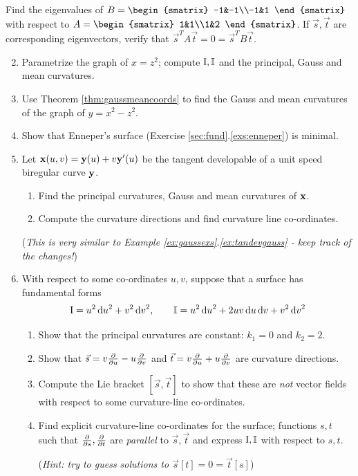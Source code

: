 \begin{exercises}{}{}
	\exstart Find the eigenvalues of $B=
	\begin{smatrix}
		-1&-1\\-1&1
	\end{smatrix}$
	with respect to $A=
	\begin{smatrix}
		1&1\\1&2
	\end{smatrix}$.
	If $\vec s,\vec t$ are corresponding eigenvectors, verify that $\vec s^TA\vec t=0=\vec s^TB\vec t$.


\begin{enumerate}\setcounter{enumi}{1}
  \item Parametrize the graph of $x=z^2$; compute $\mathrm{I},\mathbb{I}$ and the principal, Gauss and mean curvatures.
  
  
  \item Use Theorem \ref{thm:gaussmeancoords} to find the Gauss and mean curvatures of the graph of $y=x^2-z^2$.
  
  
  \item Show that Enneper's surface (Exercise \ref*{sec:fund}.\ref{exs:enneper}) is minimal.
    

  \item\label{exs:tandevcurv} Let ${\mathbf{x}}(u,v)={\mathbf{y}}(u)+v{\mathbf{y}}'(u)$ be the tangent developable of a unit speed biregular curve ${\mathbf{y}}$.
  \begin{enumerate}
    \item Find the principal curvatures, Gauss and mean curvatures of ${\mathbf{x}}$.
		\item Compute the curvature directions and find curvature line co-ordinates.
	\end{enumerate}
	(\emph{This is very similar to Example \ref*{ex:gaussexs}.\ref{ex:tandevgauss} - keep track of the changes!})
	
	
	\item With respect to some co-ordinates $u,v$, suppose that a surface has fundamental forms
	\[
		\mathrm{I}=u^2\,{\mathrm{d} u}^2+v^2\,{\mathrm{d} v}^2,\qquad \mathbb{I}=u^2\,{\mathrm{d} u}^2+2uv\,{\mathrm{d} u}\,{\mathrm{d} v}+v^2\,{\mathrm{d} v}^2
	\]
	
	\begin{enumerate}
	  \item Show that the principal curvatures are constant: $k_1=0$ and $k_2=2$.
	  \item Show that $\vec s= v\frac{\partial }{\partial u}-u\frac{\partial }{\partial v}$ and $\vec t=v\frac{\partial }{\partial u}+u\frac{\partial }{\partial v}$ are curvature directions.
	  \item Compute the Lie bracket $[\vec s,\vec t]$ to show that these are \emph{not} vector fields with respect to some curvature-line co-ordinates.
	  \item Find explicit curvature-line co-ordinates for the surface; functions $s,t$ such that $\frac{\partial }{\partial s},\frac{\partial }{\partial t}$ are \emph{parallel} to $\vec s,\vec t$ and express $\mathrm{I},\mathbb{I}$ with respect to $s,t$.\par
	  (\emph{Hint: try to guess solutions to $\vec s[t]=0=\vec t[s]$})
	\end{enumerate}
	

\end{enumerate}
\end{exercises}
